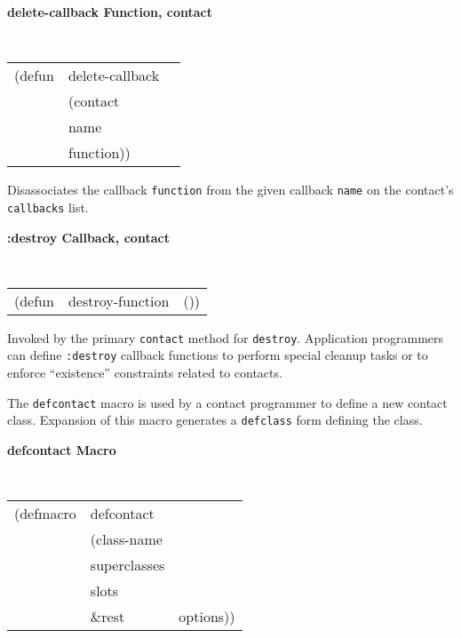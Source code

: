{\samepage
{\large {\bf delete-callback \hfill Function, contact}}
\begin{flushright} \parbox[t]{6.125in}{
\tt
\begin{tabular}{lll}
\raggedright
(defun & delete-callback & \\ 
& (contact\\
&  name \\
&  function))
\end{tabular}
\rm

}\end{flushright}}

\begin{flushright} \parbox[t]{6.125in}{
Disassociates the callback {\tt function} from the given callback {\tt name} on
the contact's {\tt callbacks} list. 

}\end{flushright}



{\samepage
{\large {\bf :destroy \hfill Callback, contact}} 
\begin{flushright} 
\parbox[t]{6.125in}{
\tt
\begin{tabular}{lll}
\raggedright
(defun & destroy-function & ())
\end{tabular}
\rm

}\end{flushright}}

\begin{flushright} \parbox[t]{6.125in}{
Invoked by the primary {\tt contact} method for {\tt destroy}.
Application programmers can define {\tt :destroy} callback functions to
perform special cleanup tasks or to enforce ``existence'' constraints
related to contacts.

}\end{flushright}



The {\tt defcontact} macro is used by a contact programmer to define a
new contact class.  Expansion of
this macro generates a {\tt defclass} form defining the class.  

{\samepage
{\large {\bf defcontact \hfill Macro}} 
\begin{flushright} \parbox[t]{6.125in}{
\tt
\begin{tabular}{lll}
\raggedright
(defmacro & defcontact & \\ 
& (class-name\\
& superclasses\\
& slots\\
& \&rest & options))
\end{tabular}
\rm

}\end{flushright}
}

